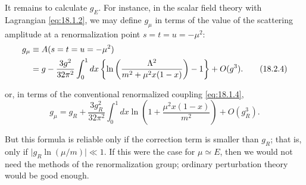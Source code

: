 It remains to calculate $g_E$. For instance, in the scalar field theory with
Lagrangian \eqref{eq:18.1.2}, we may define $g_\mu$ in terms of the value of
the scattering amplitude at a renormalization point
$s=t=u=-\mu^2$:
\begin{align}
g_\mu&\equiv A(s=t=u=-\mu^2)\notag\\
&=g-\frac{3g^2}{32\pi^2}\int_0^1dx
\left\{\ln\left(\frac{\Lambda^2}{m^2+\mu^2x(1-x)}\right)-1\right\}
+O(g^3).
\tag{18.2.4}\label{eq:18.2.4}
\end{align}
\par\noindent
or, in terms of the conventional renormalized coupling \eqref{eq:18.1.4},
\begin{equation}
g_\mu=g_R+\frac{3g_R^2}{32\pi^2}\int_0^1dx
\ln\left(1+\frac{\mu^2x(1-x)}{m^2}\right)+O(g_R^3).
\tag{18.2.5}\label{eq:18.2.5}
\end{equation}
\par\noindent
But this formula is reliable only if the correction term is smaller than
$g_R$; that is, only if $\lvert g_R\ln(\mu/m)\rvert\ll1$. If this were the
case for $\mu\simeq E$, then we would not need the methods of the
renormalization group; ordinary perturbation theory would be good enough.

